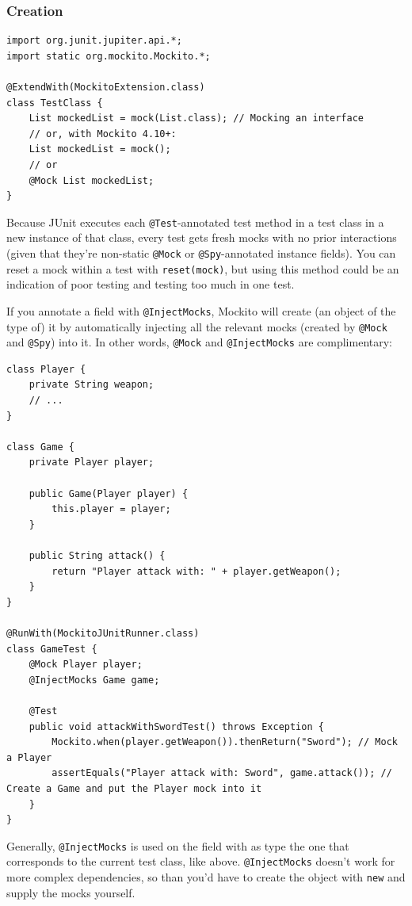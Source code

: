 \documentclass[table, xcdraw]{article}%
\begin{document}
\subsubsection{Creation}

\begin{verbatim}
import org.junit.jupiter.api.*;
import static org.mockito.Mockito.*;

@ExtendWith(MockitoExtension.class)
class TestClass {
    List mockedList = mock(List.class); // Mocking an interface
    // or, with Mockito 4.10+:
    List mockedList = mock();
    // or
    @Mock List mockedList;
}
\end{verbatim}

Because JUnit executes each \texttt{@Test}-annotated test method in a test class in a new instance of that class, every test gets fresh mocks with no prior interactions (given that they're non-static \texttt{@Mock} or \texttt{@Spy}-annotated instance fields). You can reset a mock within a test with \texttt{reset(mock)}, but using this method could be an indication of poor testing and testing too much in one test.

If you annotate a field with \texttt{@InjectMocks}, Mockito will create (an object of the type of) it by automatically injecting all the relevant mocks (created by \texttt{@Mock} and \texttt{@Spy}) into it. In other words, \texttt{@Mock} and \texttt{@InjectMocks} are complimentary:

\begin{verbatim}
class Player {
    private String weapon;
    // ...
}

class Game {
    private Player player;

    public Game(Player player) {
        this.player = player;
    }

    public String attack() {
        return "Player attack with: " + player.getWeapon();
    }
}

@RunWith(MockitoJUnitRunner.class)
class GameTest {
    @Mock Player player;
    @InjectMocks Game game; 

    @Test
    public void attackWithSwordTest() throws Exception {
        Mockito.when(player.getWeapon()).thenReturn("Sword"); // Mock a Player
        assertEquals("Player attack with: Sword", game.attack()); // Create a Game and put the Player mock into it
    }
}
\end{verbatim}

Generally, \texttt{@InjectMocks} is used on the field with as type the one that corresponds to the current test class, like above. \texttt{@InjectMocks} doesn't work for more complex dependencies, so than you'd have to create the object with \texttt{new} and supply the mocks yourself.
\end{document}
